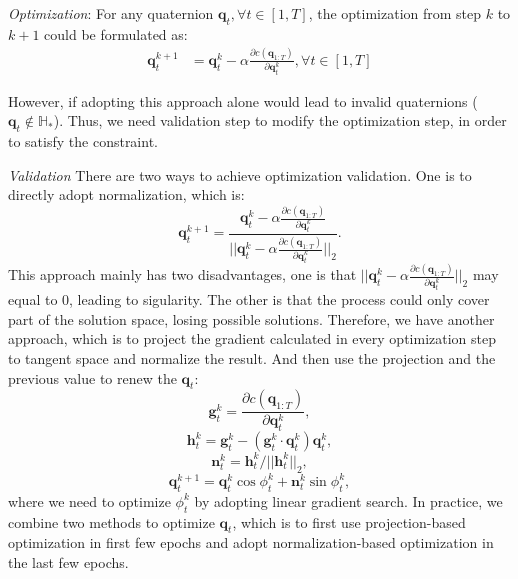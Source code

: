 \documentclass[conference]{IEEEtran}
\begin{document}
\textit{Optimization}:
For any quaternion $\boldsymbol{q}_t, \forall t \in [1, T]$, the optimization from step $k$ to $k+1$ could be formulated as:
\begin{equation}
    \begin{aligned}
        \boldsymbol{q}_t^{k+1} & = \boldsymbol{q}_t^{k} - \alpha \frac{\partial c(\boldsymbol{q}_{1:T})}
        {\partial \boldsymbol{q}_t^{k}} , \forall t \in [1, T]
    \end{aligned}
\end{equation}

However, if adopting this approach alone would lead to invalid quaternions ($\boldsymbol{q}_t \notin \mathbb{H}_*$). Thus, we need
validation step to modify the optimization step, in order to satisfy the constraint.

\textit{Validation}
There are two ways to achieve optimization validation. One is to directly adopt normalization, which is:
\begin{equation}
    \boldsymbol{q}_t^{k+1} = \frac{\boldsymbol{q}_t^{k} - \alpha \frac{\partial c(\boldsymbol{q}_{1:T})}
    {\partial \boldsymbol{q}_t^{k}}}{||\boldsymbol{q}_t^{k} - \alpha \frac{\partial c(\boldsymbol{q}_{1:T})}
    {\partial \boldsymbol{q}_t^{k}}||_2}.
\end{equation}
This approach mainly has two disadvantages, one is that $||\boldsymbol{q}_t^{k} - \alpha \frac{\partial c(\boldsymbol{q}_{1:T})}
    {\partial \boldsymbol{q}_t^{k}}||_2$ may equal to $0$, leading to sigularity.
The other is that the process could only cover part of the solution space,
losing possible solutions. Therefore, we have another approach, which is to project the gradient calculated in every optimization
step to tangent space and normalize the result. And then use the projection and the previous value to renew the $\boldsymbol{q}_t$:
\begin{equation}
    \boldsymbol{g}_t^k = \frac{\partial c(\boldsymbol{q}_{1:T})}{\partial \boldsymbol{q}_t^{k}},
\end{equation}
\begin{equation}
    \boldsymbol{h}_t^k = \boldsymbol{g}_t^k - (\boldsymbol{g}_t^k \cdot \boldsymbol{q}_t^k)\boldsymbol{q}_t^k,
\end{equation}
\begin{equation}
    \boldsymbol{n}_t^k = \boldsymbol{h}_t^k / ||\boldsymbol{h}_t^k||_2,
\end{equation}
\begin{equation}
    \boldsymbol{q}_t^{k+1} = \boldsymbol{q}_t^k\cos\phi_t^k + \boldsymbol{n}_t^k\sin\phi_t^k,
\end{equation}
where we need to optimize $\phi_t^k$ by adopting linear gradient search. In practice, we combine two methods to optimize $\boldsymbol{q}_t$,
which is to first use projection-based optimization in first few epochs and adopt normalization-based optimization in the last
few epochs.
\end{document}
